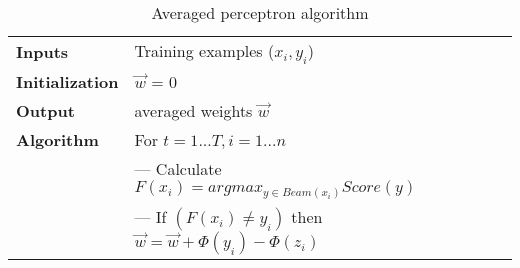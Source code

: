 \begin{table*}[t]
	\begin{center}
		\caption{\label{perceptron} Averaged perceptron algorithm}
		\begin{tabular}{|l|l|}
			\hline
			\bf Inputs & Training examples ($x_i,y_i$) \\
			\bf Initialization & $\vec{w}$ = 0 \\
			\bf Output & averaged weights $\vec{w}$ \\
			\hline
			\bf Algorithm 	& For $t = 1 ...T, i = 1 ...n$ \\
			& --- Calculate $F(x_i) = argmax_{y \in Beam(x_i)}Score(y)$ \\
			& --- If $(F(x_i) \neq y_i)$ then $\vec{w} = \vec{w} + \Phi(y_i) - \Phi(z_i)$ \\
			\hline							
		\end{tabular}
	\end{center}
\end{table*}